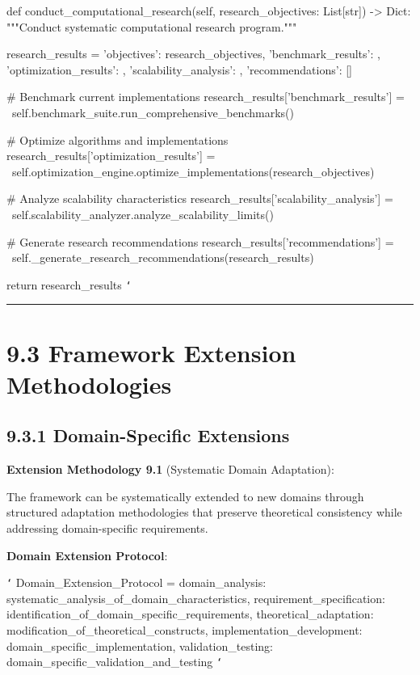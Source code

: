     def conduct_computational_research(self, research_objectives: List[str]) -> Dict:
        """Conduct systematic computational research program."""
        
        research_results = {
            'objectives': research_objectives,
            'benchmark_results': {},
            'optimization_results': {},
            'scalability_analysis': {},
            'recommendations': []
        }
        
        \# Benchmark current implementations
        research_results['benchmark_results'] = \
            self.benchmark_suite.run_comprehensive_benchmarks()
        
        \# Optimize algorithms and implementations
        research_results['optimization_results'] = \
            self.optimization_engine.optimize_implementations(research_objectives)
        
        \# Analyze scalability characteristics
        research_results['scalability_analysis'] = \
            self.scalability_analyzer.analyze_scalability_limits()
        
        \# Generate research recommendations
        research_results['recommendations'] = \
            self._generate_research_recommendations(research_results)
        
        return research_results
\texttt{`}

\hrule

\section{9.3 Framework Extension Methodologies}

\subsection{9.3.1 Domain-Specific Extensions}

\textbf{Extension Methodology 9.1} (Systematic Domain Adaptation):

The framework can be systematically extended to new domains through structured adaptation methodologies that preserve theoretical consistency while addressing domain-specific requirements.

\textbf{Domain Extension Protocol}:

\texttt{`}
Domain_Extension_Protocol = {
    domain_analysis: systematic_analysis_of_domain_characteristics,
    requirement_specification: identification_of_domain_specific_requirements,
    theoretical_adaptation: modification_of_theoretical_constructs,
    implementation_development: domain_specific_implementation,
    validation_testing: domain_specific_validation_and_testing
}
\texttt{`}

